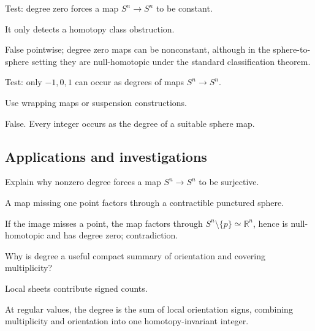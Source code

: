 \begin{exercise}\label{exr:viii03-ped-11}
Test: degree zero forces a map $S^n\to S^n$ to be constant.
\end{exercise}
\begin{hint}
It only detects a homotopy class obstruction.
\end{hint}
\begin{solution}
False pointwise; degree zero maps can be nonconstant, although in the sphere-to-sphere setting they are null-homotopic under the standard classification theorem.
\end{solution}

\begin{exercise}\label{exr:viii03-ped-12}
Test: only $-1,0,1$ can occur as degrees of maps $S^n\to S^n$.
\end{exercise}
\begin{hint}
Use wrapping maps or suspension constructions.
\end{hint}
\begin{solution}
False.  Every integer occurs as the degree of a suitable sphere map.
\end{solution}

\subsection*{Applications and investigations}

\begin{exercise}\label{exr:viii03-ped-13}
Explain why nonzero degree forces a map $S^n\to S^n$ to be surjective.
\end{exercise}
\begin{hint}
A map missing one point factors through a contractible punctured sphere.
\end{hint}
\begin{solution}
If the image misses a point, the map factors through $S^n\setminus\{p\}\simeq\mathbb R^n$, hence is null-homotopic and has degree zero; contradiction.
\end{solution}

\begin{exercise}\label{exr:viii03-ped-14}
Why is degree a useful compact summary of orientation and covering multiplicity?
\end{exercise}
\begin{hint}
Local sheets contribute signed counts.
\end{hint}
\begin{solution}
At regular values, the degree is the sum of local orientation signs, combining multiplicity and orientation into one homotopy-invariant integer.
\end{solution}

